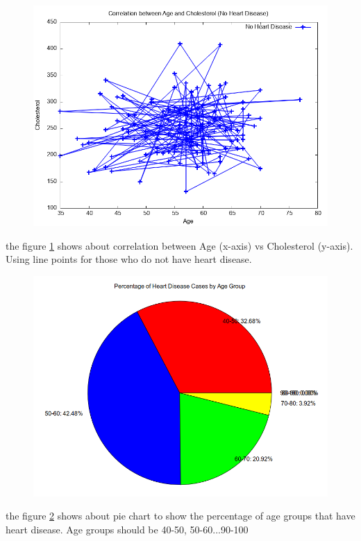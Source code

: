 \documentclass{article}
\begin{document}
	\begin{figure}[H]
	\includegraphics[width=\textwidth]{4C.png}
	\label{fig:Age vs Cholesterol}
	\end{figure}
	the figure \ref{fig:Age vs Cholesterol} shows about correlation between Age (x-axis) vs Cholesterol (y-axis). Using line points for those who do not have heart disease.
	
	\begin{figure}[H]
	\includegraphics[width=\textwidth]{4D.png}
	\label{fig:piechart}
	\end{figure}
	the figure \ref{fig:piechart} shows about pie chart to show the percentage of age groups that have heart disease. Age groups should be 40-50, 50-60...90-100
\end{document}
